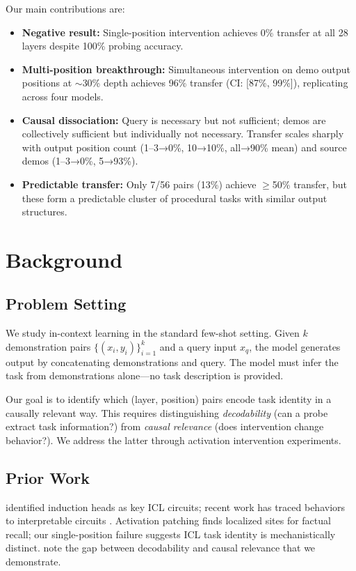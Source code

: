 \documentclass{article}
\begin{document}
Our main contributions are:
\begin{itemize}
    \item \textbf{Negative result:} Single-position intervention achieves 0\% transfer at all 28 layers despite 100\% probing accuracy.
    \item \textbf{Multi-position breakthrough:} Simultaneous intervention on demo output positions at $\sim$30\% depth achieves 96\% transfer (CI: [87\%, 99\%]), replicating across four models.
    \item \textbf{Causal dissociation:} Query is necessary but not sufficient; demos are collectively sufficient but individually not necessary. Transfer scales sharply with output position count (1--3→0\%, 10→10\%, all→90\% mean) and source demos (1--3→0\%, 5→93\%).
    \item \textbf{Predictable transfer:} Only 7/56 pairs (13\%) achieve $\geq$50\% transfer, but these form a predictable cluster of procedural tasks with similar output structures.
\end{itemize}

\section{Background}
\label{sec:background}

\subsection{Problem Setting}

We study in-context learning in the standard few-shot setting. Given $k$ demonstration pairs $\{(x_i, y_i)\}_{i=1}^k$ and a query input $x_q$, the model generates output by concatenating demonstrations and query. The model must infer the task from demonstrations alone---no task description is provided.

Our goal is to identify which (layer, position) pairs encode task identity in a causally relevant way. This requires distinguishing \emph{decodability} (can a probe extract task information?) from \emph{causal relevance} (does intervention change behavior?). We address the latter through activation intervention experiments.

\subsection{Prior Work}

\citet{olsson2022context} identified induction heads as key ICL circuits; recent work has traced behaviors to interpretable circuits \citep{wang2023interpretability,conmy2023towards}. Activation patching \citep{vig2020investigating,meng2022locating} finds localized sites for factual recall; our single-position failure suggests ICL task identity is mechanistically distinct. \citet{belinkov2019analysis} note the gap between decodability and causal relevance that we demonstrate.
\end{document}

